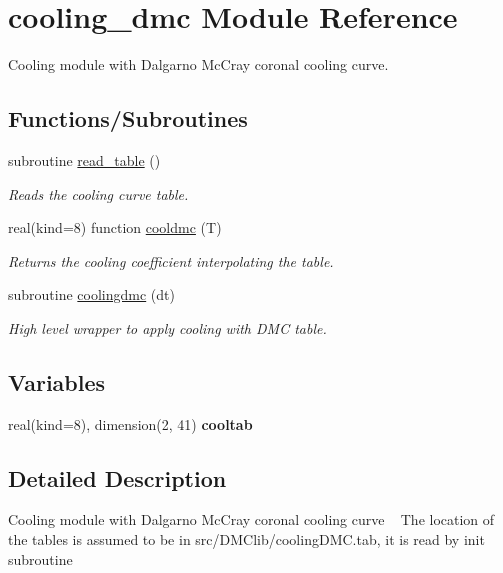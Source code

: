 \hypertarget{namespacecooling__dmc}{}\section{cooling\+\_\+dmc Module Reference}
\label{namespacecooling__dmc}


Cooling module with Dalgarno Mc\+Cray coronal cooling curve.  


\subsection*{Functions/\+Subroutines}
\begin{DoxyCompactItemize}
\item 
subroutine \hyperlink{namespacecooling__dmc_a7874b4f8a76399e87e0a22aecd088cf8}{read\+\_\+table} ()
\begin{DoxyCompactList}\small\item\em Reads the cooling curve table. \end{DoxyCompactList}\item 
real(kind=8) function \hyperlink{namespacecooling__dmc_af987bbf144f596d57b154427bbb82ae5}{cooldmc} (T)
\begin{DoxyCompactList}\small\item\em Returns the cooling coefficient interpolating the table. \end{DoxyCompactList}\item 
subroutine \hyperlink{namespacecooling__dmc_ad51341dd3b898a1fe0f7c298cf7e49ce}{coolingdmc} (dt)
\begin{DoxyCompactList}\small\item\em High level wrapper to apply cooling with D\+M\+C table. \end{DoxyCompactList}\end{DoxyCompactItemize}
\subsection*{Variables}
\begin{DoxyCompactItemize}
\item 
\hypertarget{namespacecooling__dmc_aa692bc7125c6e889f3cf993f9f48f9d3}{}real(kind=8), dimension(2, 41) {\bfseries cooltab}\label{namespacecooling__dmc_aa692bc7125c6e889f3cf993f9f48f9d3}

\end{DoxyCompactItemize}


\subsection{Detailed Description}
Cooling module with Dalgarno Mc\+Cray coronal cooling curve ~\newline
 The location of the tables is assumed to be in src/\+D\+M\+Clib/cooling\+D\+M\+C.\+tab, it is read by init subroutine 

